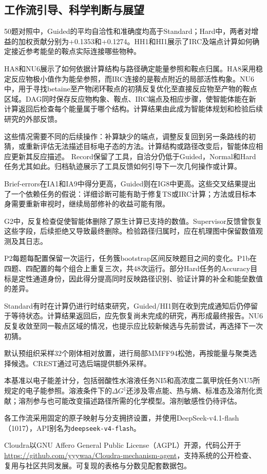 \subsection{工作流引导、科学判断与展望}

50题对照中，Guided的平均自洽性和准确度均高于Standard；Hard中，两者对增益的加权贡献分别为+0.1353和+0.1274。HH1和HI1展示了IRC及端点计算如何确定接近参考能垒的鞍点实际连接哪些物种。

HA8和NU6展示了如何依据计算结构与路径确定能量参照和鞍点归属。HA8采用稳定反应物极小值作为能垒参照，而IRC连接的是鞍点附近的局部活性构象。NU6中，用于寻找betaine至产物闭环鞍点的初猜反复优化至直接反应物至产物的鞍点区域。DAG同时保存反应物构象、鞍点、IRC端点及相应步骤，使智能体能在新计算返回后检查每个能量属于哪个结构。计算结果由此成为智能体规划和检验后续研究的外部反馈。\citep{valmeekam2023planning}

这些情况需要不同的后续操作：补算缺少的端点，调整反复回到另一条路线的初猜，或重新评估无法描述目标电子态的方法。计算结构或路径改变后，智能体应相应更新其反应描述。\citep{turpin2023unfaithful} Record保留了工具，自洽分仍低于Guided，Normal和Hard任务尤其如此。归档轨迹展示了工具反馈如何引导下一次几何操作或计算。\citep{ref18,huang2024selfcorrect}

Brief-errors在IA1和IA9中得分更高，Guided则在IG8中更高。这些交叉结果提出了一个依赖任务的假说：详细诊断可能有助于修复TS或IRC计算；方法或目标本身需要重新审视时，继续局部修补的收益可能有限。

G2中，反复检查促使智能体删除了原生计算已支持的数值。Supervisor反馈曾恢复这些字段，后续拒绝又导致最终删除。检验路径归属时，应在机理图中保留数值观测及其日志。

P2每题每配置保留一次运行，任务簇bootstrap区间反映题目之间的变化。P1b在四题、四配置的每个组合上重复三次，共48次运行。部分Hard任务的Accuracy目标是定性通道身份，因此得分提高同时反映路径识别、验证计算的补全和能垒数值的差异。

Standard有时在计算仍进行时结束研究，Guided/HI1则在收到完成通知后仍停留于等待状态。计算结果返回后，应先恢复尚未完成的研究，再形成最终报告。NU6反复收敛至同一鞍点区域的情况，也提示应比较新候选与先前尝试，再选择下一次初猜。

默认预组织采样32个刚体相对放置，进行局部MMFF94松弛，再按能量与聚类选择候选。CREST通过可选后端提供额外采样。

本基准以电子能差计分，包括弱酸性水溶液任务NI5和高浓度二氯甲烷任务NU5所规定的电子能参照。溶液条件下的$\Delta G^\ddagger$还涉及零点能、热与熵、标准态及溶剂化贡献；溶剂参与也可能改变描述路径所需的化学模型。溶剂敏感性仍待评估。

各工作流采用固定的原子映射与分支拥挤设置，并使用DeepSeek-v4.1-flash（1017），API别名为\texttt{deepseek-v4-flash}。

Cloudra以GNU Affero General Public License（AGPL）开源，代码公开于\url{https://github.com/yyywaa/Cloudra-mechanism-agent}，支持系统的公开检查、复用与社区共同发展。可复现的表格与分数见配套数据包。
